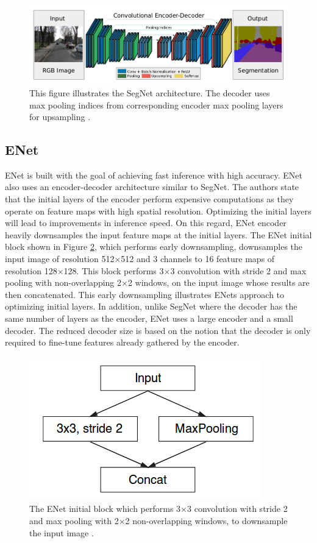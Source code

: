 	\begin{figure}[h]
		\centering
		\includegraphics[width=1\linewidth]{images/segnet}
		\caption{This figure illustrates the SegNet architecture. The decoder uses max pooling indices from corresponding encoder max pooling layers for upsampling \cite{DBLP:journals/corr/BadrinarayananK15}.}
		\label{Fig:segnet}
	\end{figure}

\subsection{ENet}

ENet \cite{DBLP:journals/corr/PaszkeCKC16} is built with the goal of achieving fast inference with high accuracy. ENet also uses an encoder-decoder architecture similar to SegNet. The authors state that the initial layers of the encoder perform expensive computations as they operate on feature maps with high spatial resolution. Optimizing the initial layers will lead to improvements in inference speed. On this regard, ENet encoder heavily downsamples the input feature maps at the initial layers. The ENet initial block shown in Figure \ref{Fig:enet}, which performs early downsampling, downsamples the input image of resolution 512$\times$512 and 3 channels to 16 feature maps of resolution 128$\times$128. This block performs 3$\times$3 convolution with stride 2 and max pooling with non-overlapping 2$\times$2 windows, on the input image whose results are then concatenated. This early downsampling illustrates ENets approach to optimizing initial layers. In addition, unlike SegNet where the decoder has the same number of layers as the encoder, ENet uses a large encoder and a small decoder. The reduced decoder size is based on the notion that the decoder is only required to fine-tune features already gathered by the encoder. 

	\begin{figure}[h]
		\centering
		\includegraphics[width=.4\linewidth]{images/enet}
		\caption{The ENet initial block which performs 3$\times$3 convolution with stride 2 and max pooling with 2$\times$2 non-overlapping windows, to downsample the input image \cite{DBLP:journals/corr/PaszkeCKC16}.}
		\label{Fig:enet}
	\end{figure}


